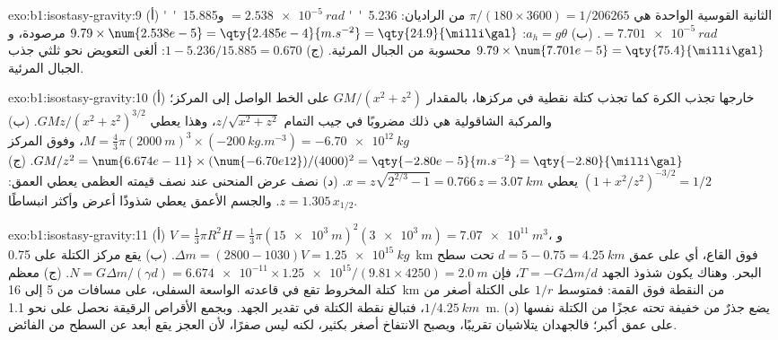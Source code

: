 \begin{solution}{exo:b1:isostasy-gravity:9}
(أ) الثانية القوسية الواحدة هي $\pi/(180\times3600) = 1/\num{206265}$ من الراديان:
\qty{5.236}{''} $= \qty{2.538e-5}{rad}$ و\qty{15.885}{''} $=
\qty{7.701e-5}{rad}$. (ب) $a_h = g\theta$: $9.79\times\num{2.538e-5} =
\qty{2.485e-4}{m.s^{-2}} = \qty{24.9}{\milli\gal}$ مرصودة، و $9.79\times\num{7.701e-5} = \qty{75.4}{\milli\gal}$ محسوبة من الجبال المرئية. (ج) $1 - 5.236/15.885 = 0.670$: ألغى التعويض نحو ثلثي جذب الجبال المرئية.
\end{solution}

\begin{solution}{exo:b1:isostasy-gravity:10}
(أ) خارجها تجذب الكرة كما تجذب كتلة نقطية في مركزها، بالمقدار $GM/(x^2 + z^2)$ على الخط الواصل إلى المركز؛ والمركبة الشاقولية هي ذلك مضروبًا في جيب التمام $z/\sqrt{x^2 + z^2}$، وهذا يعطي $GMz/(x^2 + z^2)^{3/2}$.
(ب) $M = \tfrac43\pi(\qty{2000}{m})^3\times(\qty{-200}{kg.m^{-3}}) =
\qty{-6.70e12}{kg}$، وفوق المركز $GM/z^2 = \num{6.674e-11}\times
(\num{-6.70e12})/(4000)^2 = \qty{-2.80e-5}{m.s^{-2}} = \qty{-2.80}{\milli\gal}$.
(ج) $(1 + x^2/z^2)^{-3/2} = 1/2$ يعطي $x = z\sqrt{2^{2/3} - 1} = 0.766\,z =
\qty{3.07}{km}$. (د) نصف عرض المنحنى عند نصف قيمته العظمى يعطي العمق: $z = 1.305\,x_{1/2}$. والجسم الأعمق يعطي شذوذًا أعرض وأكثر انبساطًا.
\end{solution}

\begin{solution}{exo:b1:isostasy-gravity:11}
(أ) $V = \tfrac13\pi R^2 H = \tfrac13\pi(\qty{15e3}{m})^2(\qty{3e3}{m}) =
\qty{7.07e11}{m^3}$، و$\Delta m = (2800 - 1030)V = \qty{1.25e15}{kg}$.
(ب) يقع مركز الكتلة على \qty{0.75}{km} فوق القاع، أي على عمق $d = 5 - 0.75 = \qty{4.25}{km}$ تحت سطح البحر. وهناك يكون شذوذ الجهد $T = -G\Delta m/d$، فإن $N = G\Delta m/(\gamma d) =
\num{6.674e-11}\times\num{1.25e15}/(9.81\times4250) = \qty{2.0}{m}$.
(ج) معظم كتلة المخروط تقع في قاعدته الواسعة السفلى، على مسافات من 5 إلى \qty{16}{km} من النقطة فوق القمة: فمتوسط $1/r$ على الكتلة أصغر من $1/\qty{4.25}{km}$، فتبالغ نقطة الكتلة في تقدير الجهد. وبجمع الأقراص الرقيقة نحصل على نحو \qty{1.1}{m}. (د) يضع جذرٌ من  خفيفة تحته عجزًا من الكتلة نفسها على عمق أكبر؛ فالجهدان يتلاشيان تقريبًا، ويصبح الانتفاخ أصغر بكثير، لكنه ليس صفرًا، لأن العجز يقع أبعد عن السطح من الفائض.
\end{solution}

